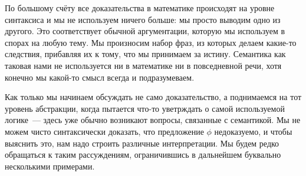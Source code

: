 По большому счёту все доказательства в математике происходят на уровне синтаксиса и мы не используем ничего больше: мы просто выводим одно из другого. Это соответствует обычной аргументации, которую мы используем в спорах на любую тему. Мы произносим набор фраз, из которых делаем какие-то следствия, прибавляя их к тому, что мы принимаем за истину. Семантика как таковая нами не используется ни в математике ни в повседневной речи, хотя конечно мы какой-то смысл всегда и подразумеваем.

Как только мы начинаем обсуждать не само доказательство, а поднимаемся на тот уровень абстракции, когда пытается что-то уветрждать о самой используемой логике~--- здесь уже обычно возникают вопросы, связанные с семантикой. Мы не можем чисто синтаксически доказать, что предложение $\phi$ недоказуемо, и чтобы выяснить это, нам надо строить различные интерпретации. Мы будем редко обращаться к таким рассуждениям, ограничившись в дальнейшем буквально несколькими примерами.